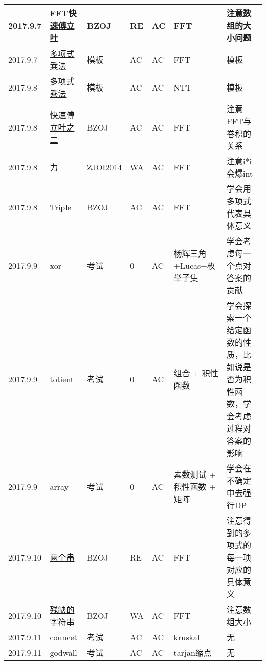 \documentclass[a4paper]{article}
\begin{document}
\begin{longtable}{|p{1.5cm}|p{2.5cm}|p{1.6cm}|p{1.6cm}|p{1cm}|p{3cm}|p{4cm}|}
		\hline
		2017.9.7 & \href {http://www.lydsy.com/JudgeOnline/problem.php?id=2179}{FFT快速傅立叶}
		 & BZOJ & RE & AC & FFT & 注意数组的大小问题\\
		
		\hline
		2017.9.7 & \href {https://loj.ac/problem/108}{多项式乘法}
		 & 模板 & AC & AC & FFT & 模板\\
		
		\hline
		2017.9.8 & \href {https://loj.ac/problem/108}{多项式乘法}
		 & 模板 & AC & AC & NTT & 模板\\
		
		\hline
		2017.9.8 & \href {http://www.lydsy.com/JudgeOnline/problem.php?id=2194}{快速傅立叶之二}
		 & BZOJ & AC & AC & FFT & 注意FFT与卷积的关系\\
		
		\hline
		2017.9.8 & \href {http://www.lydsy.com/JudgeOnline/problem.php?id=3527}{力}
		 & ZJOI2014 & WA & AC & FFT & 注意i*i会爆int\\
		
		\hline
		2017.9.8 & \href {http://www.lydsy.com/JudgeOnline/problem.php?id=3771}{Triple}
		 & BZOJ & AC & AC & FFT & 学会用多项式代表具体意义\\
		
		\hline
		2017.9.9 & xor
		 & 考试 & 0 & AC & 杨辉三角+Lucas+枚举子集 & 学会考虑每一个点对答案的贡献\\
		
		\hline
		2017.9.9 & totient
		 & 考试 & 0 & AC & 组合 + 积性函数 & 学会探索一个给定函数的性质，比如说是否为积性函数，学会考虑过程对答案的影响\\
		
		\hline
		2017.9.9 & array
		 & 考试 & 0 & AC & 素数测试 + 积性函数 + 矩阵 & 学会在不确定中去强行DP\\
		
		\hline
		2017.9.10 & \href {http://www.lydsy.com/JudgeOnline/problem.php?id=4503}{两个串}
		 & BZOJ & RE & AC & FFT & 注意得到的多项式的每一项对应的具体意义\\
		
		\hline
		2017.9.10 & \href {http://www.lydsy.com/JudgeOnline/problem.php?id=4259}{残缺的字符串}
		 & BZOJ & WA & AC & FFT & 注意数组大小\\
		
		\hline
		2017.9.11 & conncet
		 & 考试 & AC & AC & kruskal & 无\\
		
		\hline
		2017.9.11 & godwall
		 & 考试 & AC & AC & tarjan缩点 & 无\\
		

\end{longtable}
\end{document}
